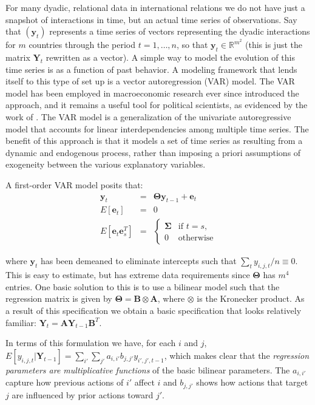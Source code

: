 \documentclass[3p,times,twocolumn,authoryear,12pt]{elsarticle}
\newcommand{\bl}[1]{{\mathbf #1}}
\begin{document}
For many dyadic, relational data in international relations we do not have just a snapshot of interactions in time, but an actual time series of observations. Say that $(\mathbf y_t)$ represents a time series of vectors representing the dyadic interactions for $m$ countries through the period $t = 1, \ldots, n$, so that $\mathbf y_t \in \mathbb{R}^{m^2}$ (this is just the matrix $\bl Y_t$ rewritten as a vector). A simple way to model the evolution of this time series is as a function of past behavior. A modeling framework that lends itself to this type of set up is a vector autoregression (VAR) model. The VAR model has been employed in macroeconomic research ever since \citet{sims:1980} introduced the approach, and it remains a useful tool for political scientists, as evidenced by the work of \citet{brandt:freeman:2006}. The VAR model is a generalization of the univariate autoregressive model that accounts for linear interdependencies among multiple time series. The benefit of this approach is that it models a set of time series as resulting from a dynamic and endogenous process, rather than imposing a priori assumptions of exogeneity between the various explanatory variables. 

A first-order VAR model posits that:
\begin{eqnarray}
	\bl y_t &=& { \bl \Theta \bl y_{t-1} +\bl e_t}\\
	E[\bl e_t] &=& 0 \\
	E[\bl e_t \bl e^T_s] &=& \begin{cases}  \bl \Sigma &\mbox{if } t=s, \\ 0 &\mbox{otherwise}\end{cases}
\end{eqnarray}

\noindent where $\bl y_t$ has been demeaned to eliminate intercepts such that $\sum_t y_{i,j,t}/n \equiv 0$. This is easy to estimate, but has extreme data requirements since $\bl \Theta$ has $m^4$ entries. One basic solution to this is to use a bilinear model such that the regression matrix is given by $\bl \Theta = \bl B \otimes \bl A$, where $\otimes$ is the Kronecker product. As a result of this specification we obtain a basic specification that looks relatively familiar: $\bl Y_t = \bl A\bl Y_{t-1}\bl B^T$. 

In terms of this formulation we have, for each $i$ and $j$, $E[y_{i,j,t}| \bl Y_{t-1}] = \sum_{i'} \sum_{j'} a_{i,i'} b_{j,j'} y_{i',j',t-1}$, which makes clear that the {\em regression parameters are multiplicative functions} of the basic bilinear parameters. The $a_{i,i'}$ capture how previous actions of $i'$ affect $i$ and $b_{j,j'}$ shows how actions that target $j$ are influenced by prior actions toward $j'$.
\end{document}
